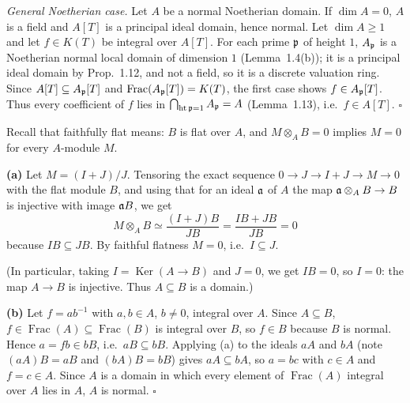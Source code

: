 \documentclass[11pt]{article}
\begin{document}
\emph{General Noetherian case.} Let $A$ be a normal Noetherian domain. If $\dim A=0$, $A$ is a field and $A[T]$ is a principal ideal domain, hence normal. Let $\dim A\ge1$ and let $f\in K(T)$ be integral over $A[T]$. For each prime $\mathfrak p$ of height $1$, $A_\mathfrak p$ is a Noetherian normal local domain of dimension $1$ (Lemma~1.4(b)); it is a principal ideal domain by Prop.~1.12, and not a field, so it is a discrete valuation ring. Since $A[T]\subseteq A_\mathfrak p[T]$ and $\operatorname{Frac}(A_\mathfrak p[T])=K(T)$, the first case shows $f\in A_\mathfrak p[T]$. Thus every coefficient of $f$ lies in $\bigcap_{\operatorname{ht}\mathfrak p=1}A_\mathfrak p=A$ (Lemma~1.13), i.e.\ $f\in A[T]$. \hfill$\square$

\pf
Recall that faithfully flat means: $B$ is flat over $A$, and $M\otimes_AB=0$ implies $M=0$ for every $A$-module $M$.

\textbf{(a)} Let $M=(I+J)/J$. Tensoring the exact sequence $0\to J\to I+J\to M\to0$ with the flat module $B$, and using that for an ideal $\mathfrak a$ of $A$ the map $\mathfrak a\otimes_AB\to B$ is injective with image $\mathfrak a B$, we get
\[ M\otimes_AB\simeq\frac{(I+J)B}{JB}=\frac{IB+JB}{JB}=0 \]
because $IB\subseteq JB$. By faithful flatness $M=0$, i.e.\ $I\subseteq J$.

(In particular, taking $I=\operatorname{Ker}(A\to B)$ and $J=0$, we get $IB=0$, so $I=0$: the map $A\to B$ is injective. Thus $A\subseteq B$ is a domain.)

\textbf{(b)} Let $f=ab^{-1}$ with $a,b\in A$, $b\neq0$, integral over $A$. Since $A\subseteq B$, $f\in\operatorname{Frac}(A)\subseteq\operatorname{Frac}(B)$ is integral over $B$, so $f\in B$ because $B$ is normal. Hence $a=fb\in bB$, i.e.\ $aB\subseteq bB$. Applying (a) to the ideals $aA$ and $bA$ (note $(aA)B=aB$ and $(bA)B=bB$) gives $aA\subseteq bA$, so $a=bc$ with $c\in A$ and $f=c\in A$. Since $A$ is a domain in which every element of $\operatorname{Frac}(A)$ integral over $A$ lies in $A$, $A$ is normal. \hfill$\square$
\end{document}
